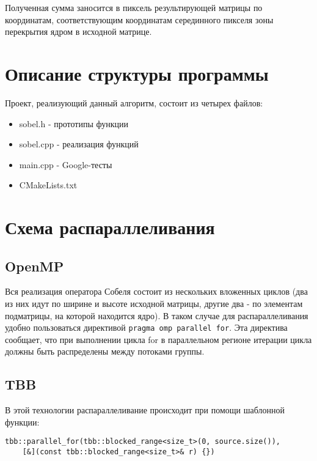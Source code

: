 \documentclass[12pt]{article}
\begin{document}
Полученная сумма заносится в пиксель результирующей матрицы по координатам, соответствующим координатам серединного пикселя зоны перекрытия ядром в исходной матрице.
\newpage 

\section*{Описание структуры программы}
Проект, реализующий данный алгоритм, состоит из четырех файлов: 
\begin{itemize}
\item sobel.h - прототипы функции
\item sobel.cpp - реализация функций
\item main.cpp - Google-тесты
\item CMakeLists.txt
\end{itemize}

\newpage 

\section*{Схема распараллеливания}

\subsection*{OpenMP}

Вся реализация оператора Собеля состоит из нескольких вложенных циклов (два из них идут по ширине и высоте исходной матрицы, другие два - по элементам подматрицы, на которой находится ядро). В таком случае для распараллеливания удобно пользоваться директивой \verb|pragma omp parallel for|. Эта директива сообщает, что при выполнении цикла for в параллельном регионе итерации цикла должны быть распределены между потоками группы.

\subsection*{TBB}

В этой технологии распараллеливание происходит при помощи шаблонной функции:
\begin{verbatim}
tbb::parallel_for(tbb::blocked_range<size_t>(0, source.size()),
    [&](const tbb::blocked_range<size_t>& r) {})
\end{verbatim}
\end{document}
